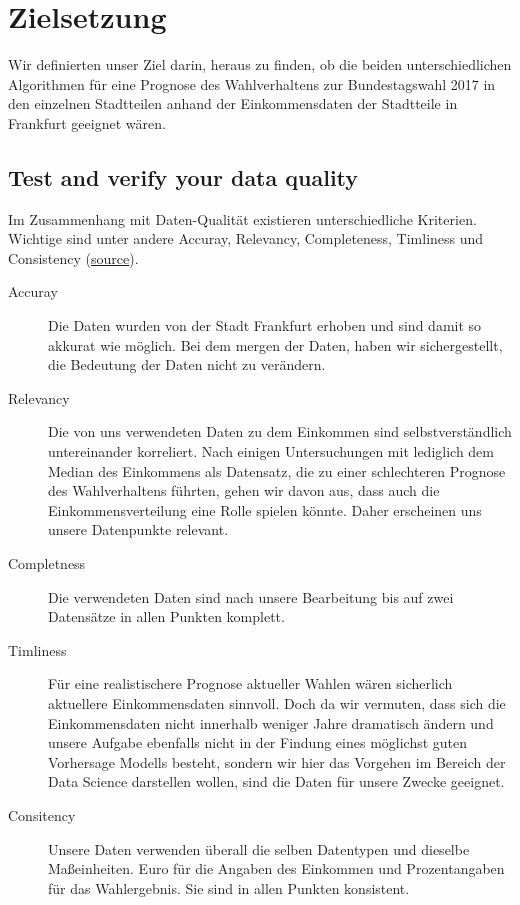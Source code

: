 \documentclass[a4paper,10pt]{scrartcl}
\begin{document}
\section{Zielsetzung}
Wir definierten unser Ziel darin, heraus zu finden, ob die beiden unterschiedlichen Algorithmen für eine Prognose des Wahlverhaltens zur Bundestagswahl 2017 in den einzelnen Stadtteilen anhand der Einkommensdaten der Stadtteile in Frankfurt geeignet wären. 

\subsection{Test and verify your data quality}
Im Zusammenhang mit Daten-Qualität existieren unterschiedliche Kriterien. Wichtige sind unter andere Accuray, Relevancy, Completeness, Timliness und Consistency (\href{https://towardsdatascience.com/7-steps-to-ensure-and-sustain-data-quality-3c0040591366}{source}).
\begin{description}
\item[Accuray] Die Daten wurden von der Stadt Frankfurt erhoben und sind damit so akkurat wie möglich. Bei dem mergen der Daten, haben wir sichergestellt, die Bedeutung der Daten nicht zu verändern.
\item[Relevancy] Die von uns verwendeten Daten zu dem Einkommen sind selbstverständlich untereinander korreliert. Nach einigen Untersuchungen mit lediglich dem Median des Einkommens als Datensatz, die zu einer schlechteren Prognose des Wahlverhaltens führten, gehen wir davon aus, dass auch die Einkommensverteilung eine Rolle spielen könnte. Daher erscheinen uns unsere Datenpunkte relevant.
\item[Completness] Die verwendeten Daten sind nach unsere Bearbeitung bis auf zwei Datensätze in allen Punkten komplett. 
\item[Timliness] Für eine realistischere Prognose aktueller Wahlen wären sicherlich aktuellere Einkommensdaten sinnvoll. Doch da wir vermuten, dass sich die Einkommensdaten nicht innerhalb weniger Jahre dramatisch ändern und unsere Aufgabe ebenfalls nicht in der Findung eines möglichst guten Vorhersage Modells besteht, sondern wir hier das Vorgehen im Bereich der Data Science darstellen wollen, sind die Daten für unsere Zwecke geeignet.\\
\item[Consitency] Unsere Daten verwenden überall die selben Datentypen und dieselbe Maßeinheiten. Euro für die Angaben des Einkommen und Prozentangaben für das Wahlergebnis. Sie sind in allen Punkten konsistent.
\end{description}
\end{document}
